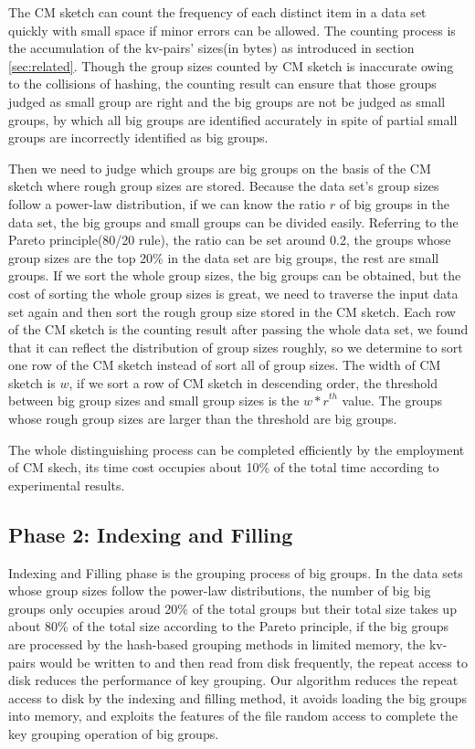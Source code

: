 The CM sketch can count the frequency of each distinct item in a data set quickly with small space if minor errors can be allowed. The counting process is the accumulation of the kv-pairs' sizes(in bytes) as introduced in section \ref{sec:related}. Though the group sizes counted by CM sketch is inaccurate owing to the collisions of hashing, the counting result can ensure that those groups judged as small group are right and the big groups are not be judged as small groups, by which all big groups are identified accurately in spite of partial small groups are incorrectly identified as big groups. 

Then we need to judge which groups are big groups on the basis of the CM sketch where rough group sizes are stored. Because the data set's group sizes follow a power-law distribution, if we can know the ratio $r$ of big groups in the data set, the big groups and small groups can be divided easily. Referring to the Pareto principle(80/20 rule), the ratio can be set around 0.2, the groups whose group sizes are the top 20\% in the data set are big groups, the rest are small groups. If we sort the whole group sizes, the big groups can be obtained, but the cost of sorting the whole group sizes is great, we need to traverse the input data set again and then sort the rough group size stored in the CM sketch. Each row of the CM sketch is the counting result after passing the whole data set, we found that it can reflect the distribution of group sizes roughly, so we determine to sort one row of the CM sketch instead of sort all of group sizes. The width of CM sketch is $w$, if we sort a row of CM sketch in descending order, the threshold between big group sizes and small group sizes is the ${w*r}^{th}$ value. The groups whose rough group sizes are larger than the threshold are big groups. 

The whole distinguishing process can be completed efficiently by the employment of CM skech, its time cost occupies about 10\% of the total time according to experimental results.

\subsection{Phase 2: Indexing and Filling} 

Indexing and Filling phase is the grouping process of big groups. In the data sets whose group sizes follow the power-law distributions, the number of big big groups only occupies aroud 20\% of the total groups but their total size takes up about 80\% of the total size according to the Pareto principle, if the big groups are processed by the hash-based grouping methods in limited memory, the kv-pairs would be written to and then read from disk frequently, the repeat access to disk reduces the performance of key grouping. Our algorithm reduces the repeat access to disk by the indexing and filling method, it avoids loading the big groups into memory, and exploits the features of the file random access to complete the key grouping operation of big groups. 

